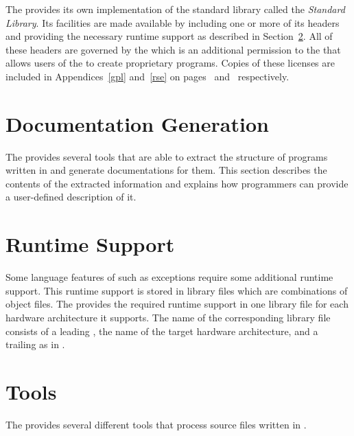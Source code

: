The \ecs{} provides its own implementation of the \cpp{} standard library called the \emph{Standard \cpp{} Library}.
Its facilities are made available by including one or more of its headers and providing the necessary runtime support as described in Section~\ref{sec:cppruntimesupport}.
All of these headers are governed by the \rse{} which is an additional permission to the \gpl{} that allows users of the \ecs{} to create proprietary programs.
\ifbook Copies of these licenses are included in Appendices~\ref{gpl} and~\ref{rse} on pages~\pageref{gpl} and~\pageref{rse} respectively. \fi



\section{Documentation Generation}

The \ecs{} provides several tools that are able to extract the structure of programs written in \cpp{} and generate documentations for them.
This section describes the contents of the extracted information and explains how programmers can provide a user-defined description of it.

\ifbook\else\markuptable\fi

\section{Runtime Support}\label{sec:cppruntimesupport}

Some language features of \cpp{} such as exceptions require some additional runtime support.
This runtime support is stored in library files which are combinations of object files. \seeobject
The \ecs{} provides the required runtime support in one library file for each hardware architecture it supports.
The name of the corresponding library file consists of a leading , the name of the target hardware architecture, and a trailing  as in .

\section{\cpp{} Tools}

The \ecs{} provides several different tools that process source files written in \cpp{}.
\interface

